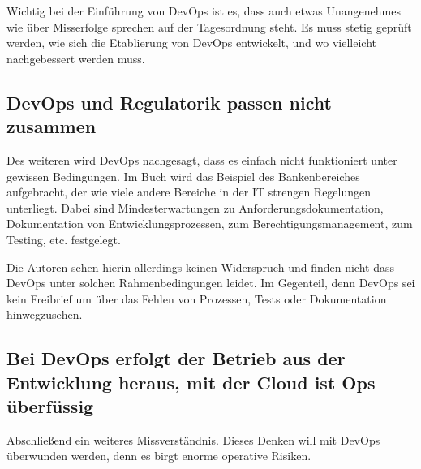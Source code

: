 Wichtig bei der Einführung von \ac{DevOps} ist es, dass auch etwas Unangenehmes wie über Misserfolge sprechen auf der Tagesordnung steht. Es muss stetig geprüft werden, wie sich die Etablierung von \ac{DevOps} entwickelt, und wo vielleicht nachgebessert werden muss.

\subsection{DevOps und Regulatorik passen nicht zusammen}

Des weiteren wird \ac{DevOps} nachgesagt, dass es einfach nicht funktioniert unter gewissen Bedingungen. Im Buch wird das Beispiel des Bankenbereiches aufgebracht, der wie viele andere Bereiche in der IT strengen Regelungen unterliegt. Dabei sind \glqq Mindesterwartungen zu Anforderungsdokumentation,
Dokumentation von Entwicklungsprozessen, zum Berechtigungsmanagement, zum Testing, etc. festgelegt\grqq \cite{halstenberg:2020}.

Die Autoren sehen hierin allerdings keinen Widerspruch und finden nicht dass \ac{DevOps} unter solchen Rahmenbedingungen leidet. Im Gegenteil, denn \ac{DevOps} sei kein Freibrief um über das Fehlen von Prozessen, Tests oder Dokumentation hinwegzusehen.

\subsection{Bei DevOps erfolgt der Betrieb aus der Entwicklung heraus, mit der Cloud ist Ops überfüssig}

Abschließend ein weiteres Missverständnis. Dieses Denken will mit \ac{DevOps} überwunden werden, denn es birgt enorme \glqq operative Risiken\grqq \cite{halstenberg:2020}.
